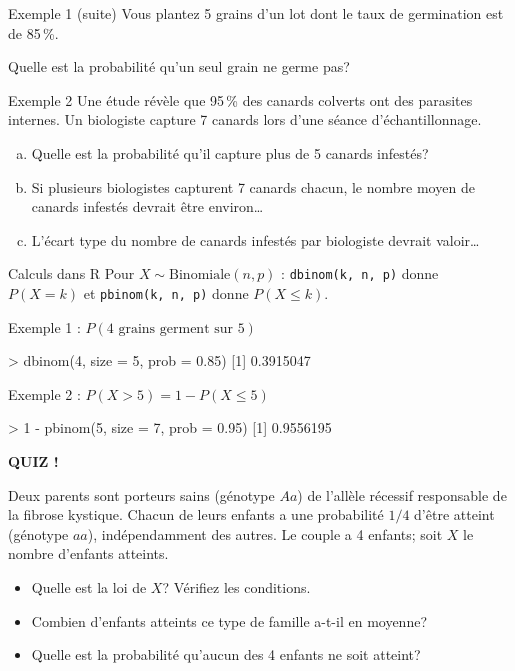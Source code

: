 \documentclass{BeamerTemplate}
\begin{document}
\begin{frame}[t]{Exemple 1 (suite)}
  Vous plantez 5 grains d'un lot dont le taux de germination est de 85\,\%.

  \medskip
  \alert{Quelle est la probabilité qu'un seul grain ne germe pas?}
\end{frame}

\begin{frame}[t]{Exemple 2}
  Une étude révèle que 95\,\% des canards colverts ont des parasites internes.
  Un biologiste capture 7 canards lors d'une séance d'échantillonnage.

  \begin{enumerate}[a)]\itemsep 1.4cm
    \item Quelle est la probabilité qu'il capture plus de 5 canards infestés?
    \item Si plusieurs biologistes capturent 7 canards chacun, le nombre moyen
      de canards infestés devrait être environ\ldots
    \item L'écart type du nombre de canards infestés par biologiste devrait
      valoir\ldots
  \end{enumerate}
\end{frame}

\begin{frame}[fragile,t]{Calculs dans R}
  Pour $X \sim \text{Binomiale}(n, p)$ :
  \texttt{dbinom(k, n, p)} donne $P(X = k)$ et \texttt{pbinom(k, n, p)} donne
  $P(X \le k)$.

  \medskip
  Exemple 1 : $P(\text{4 grains germent sur 5})$
\begin{console}
> dbinom(4, size = 5, prob = 0.85)
[1] 0.3915047
\end{console}

  Exemple 2 : $P(X > 5) = 1 - P(X \le 5)$
\begin{console}
> 1 - pbinom(5, size = 7, prob = 0.95)
[1] 0.9556195
\end{console}
\end{frame}

\begin{frame}[plain,t]
  \centerline{\LARGE\bfseries\alert{QUIZ !}}

  \medskip
  Deux parents sont porteurs sains (génotype $Aa$) de l'allèle récessif
  responsable de la fibrose kystique. Chacun de leurs enfants a une
  probabilité $1/4$ d'être atteint (génotype $aa$), indépendamment des autres.
  Le couple a 4 enfants; soit $X$ le nombre d'enfants atteints.
  \begin{itemize}\itemsep 1.2cm
    \item Quelle est la loi de $X$? Vérifiez les conditions.
    \item Combien d'enfants atteints ce type de famille a-t-il en moyenne?
    \item Quelle est la probabilité qu'aucun des 4 enfants ne soit atteint?
  \end{itemize}
\end{frame}
\end{document}
